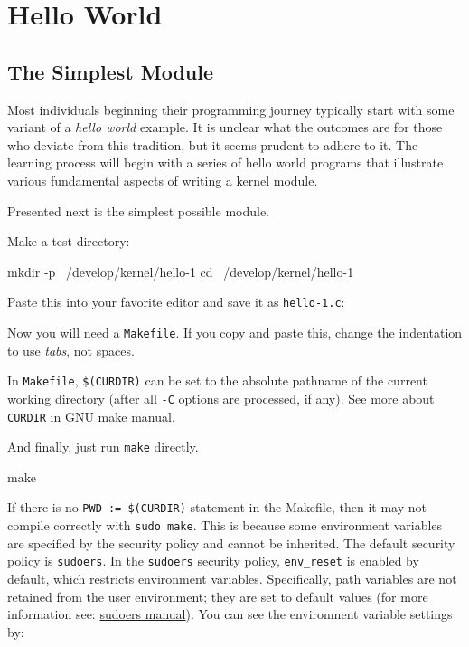 \documentclass[10pt, oneside]{book}
\begin{document}
\section{Hello World}
\label{sec:helloworld}
\subsection{The Simplest Module}
\label{sec:org2d3e245}
Most individuals beginning their programming journey typically start with some variant of a \emph{hello world} example.
It is unclear what the outcomes are for those who deviate from this tradition, but it seems prudent to adhere to it.
The learning process will begin with a series of hello world programs that illustrate various fundamental aspects of writing a kernel module.

Presented next is the simplest possible module.

Make a test directory:
\begin{codebash}
mkdir -p ~/develop/kernel/hello-1
cd ~/develop/kernel/hello-1
\end{codebash}

Paste this into your favorite editor and save it as \verb|hello-1.c|:


Now you will need a \verb|Makefile|. If you copy and paste this, change the indentation to use \textit{tabs}, not spaces.


In \verb|Makefile|, \verb|$(CURDIR)| can be set to the absolute pathname of the current working directory (after all \verb|-C| options are processed, if any).
See more about \verb|CURDIR| in \href{https://www.gnu.org/software/make/manual/make.html}{GNU make manual}.

And finally, just run \verb|make| directly.

\begin{codebash}
make
\end{codebash}

If there is no \verb|PWD := $(CURDIR)| statement in the Makefile, then it may not compile correctly with \verb|sudo make|.
This is because some environment variables are specified by the security policy and cannot be inherited.
The default security policy is \verb|sudoers|.
In the \verb|sudoers| security policy, \verb|env_reset| is enabled by default, which restricts environment variables.
Specifically, path variables are not retained from the user environment; they are set to default values (for more information see: \href{https://www.sudo.ws/docs/man/sudoers.man/}{sudoers manual}).
You can see the environment variable settings by:
\end{document}
